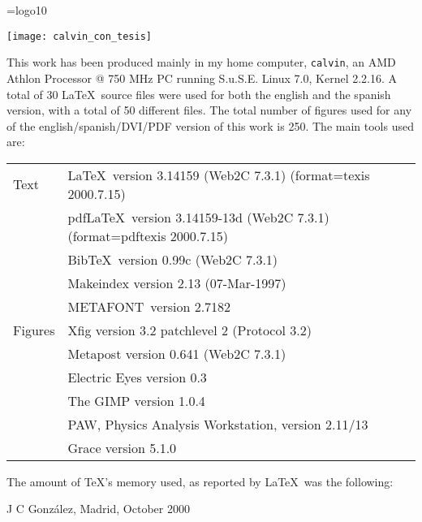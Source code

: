 
\thispagestyle{empty}
%
\mbox{}
%
\newpage
%
\thispagestyle{empty}
%
\mbox{}
%
\vfill
%
\scriptsize

\font\logo=logo10
\def\MF{\strut\hbox{\logo METAFONT}}\def\.#1{\strut\hbox{\tt #1}}

\begin{center}
  \texttt{[image: calvin\_con\_tesis]}
\end{center}

\vskip 2cm 

\noindent
This work has been produced mainly in my home computer,
\texttt{calvin}, an AMD Athlon Processor @ 750 MHz PC running S.u.S.E.
Linux 7.0, Kernel 2.2.16. A total of 30 \LaTeX\ source files were used
for both the english and the spanish version, with a total of 50
different files.  The total number of figures used for any of the
english/spanish/DVI/PDF version of this
work is 250. The main tools used are:\\

\begin{tabular}{ll}

Text
 & \LaTeX\ version 3.14159 (Web2C 7.3.1) (format=texis 2000.7.15)\\
 & pdf\LaTeX\ version 3.14159-13d (Web2C 7.3.1) (format=pdftexis 2000.7.15)\\
 & Bib\TeX\ version 0.99c (Web2C 7.3.1)\\
 & Makeindex version 2.13 (07-Mar-1997)\\
 & \MF\ version 2.7182 \vspace{4pt}\\

Figures
 & Xfig  version 3.2 patchlevel 2 (Protocol 3.2)\\
 & Metapost version 0.641 (Web2C 7.3.1)\\
 & Electric Eyes version 0.3\\
 & The GIMP version 1.0.4\\
 & PAW, Physics Analysis Workstation, version 2.11/13 \\
 & Grace version 5.1.0\\

\end{tabular}

\vskip 20pt

\noindent
The amount of \TeX's memory used, as reported by \LaTeX\, was the
following:



\vskip 20pt

\raggedleft J C Gonz\'alez, Madrid, October 2000

\endinput
%

